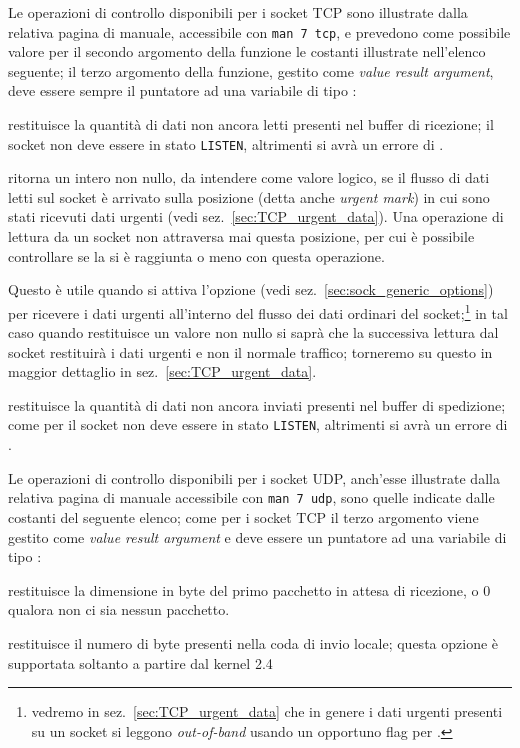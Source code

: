 Le operazioni di controllo disponibili per i socket TCP sono illustrate dalla
relativa pagina di manuale, accessibile con \texttt{man 7 tcp}, e prevedono
come possibile valore per il secondo argomento della funzione le costanti
illustrate nell'elenco seguente; il terzo argomento della funzione, gestito
come \textit{value result argument}, deve essere sempre il puntatore ad una
variabile di tipo :
\begin{basedescript}{\desclabelwidth{1.5cm}\desclabelstyle{\nextlinelabel}}
\item[\constd{SIOCINQ}] restituisce la quantità di dati non ancora letti
  presenti nel buffer di ricezione; il socket non deve essere in stato
  \texttt{LISTEN}, altrimenti si avrà un errore di .
\item[\constd{SIOCATMARK}] ritorna un intero non nullo, da intendere come
  valore logico, se il flusso di dati letti sul socket è arrivato sulla
  posizione (detta anche \textit{urgent mark}) in cui sono stati ricevuti dati
  urgenti (vedi sez.~\ref{sec:TCP_urgent_data}).  Una operazione di lettura da
  un socket non attraversa mai questa posizione, per cui è possibile
  controllare se la si è raggiunta o meno con questa operazione.

  Questo è utile quando si attiva l'opzione  (vedi
  sez.~\ref{sec:sock_generic_options}) per ricevere i dati urgenti all'interno
  del flusso dei dati ordinari del socket;\footnote{vedremo in
    sez.~\ref{sec:TCP_urgent_data} che in genere i dati urgenti presenti su un
    socket si leggono \textit{out-of-band} usando un opportuno flag per
    .}  in tal caso quando  restituisce un
  valore non nullo si saprà che la successiva lettura dal socket restituirà i
  dati urgenti e non il normale traffico; torneremo su questo in maggior
  dettaglio in sez.~\ref{sec:TCP_urgent_data}.

\item[\constd{SIOCOUTQ}] restituisce la quantità di dati non ancora inviati
  presenti nel buffer di spedizione; come per  il socket non
  deve essere in stato \texttt{LISTEN}, altrimenti si avrà un errore di
  .
\end{basedescript}

Le operazioni di controllo disponibili per i socket UDP, anch'esse illustrate
dalla relativa pagina di manuale accessibile con \texttt{man 7 udp}, sono
quelle indicate dalle costanti del seguente elenco; come per i socket TCP il
terzo argomento viene gestito come \textit{value result argument} e deve
essere un puntatore ad una variabile di tipo :
\begin{basedescript}{\desclabelwidth{1.5cm}\desclabelstyle{\nextlinelabel}}
\item[\const{FIONREAD}] restituisce la dimensione in byte del primo pacchetto
  in attesa di ricezione, o 0 qualora non ci sia nessun pacchetto.
\item[\const{TIOCOUTQ}] restituisce il numero di byte presenti nella coda di
  invio locale; questa opzione è supportata soltanto a partire dal kernel 2.4
\end{basedescript}



